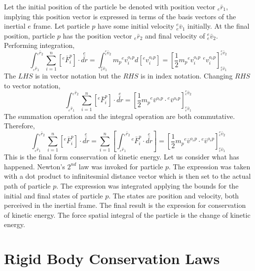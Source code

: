 \documentclass[class=report, 12pt, crop=false]{standalone}
\begin{document}
\begin{center}
Let the initial position of the particle be denoted with position vector ${}_{e}\bar{r}_{1}$, implying this position vector is expressed in terms of the basis vectors of the inertial $e$ frame. Let particle $p$ have some initial velocity ${}^{e}_{e}\bar{v}_{1}$ initially. At the final position, particle $p$ has the position vector ${}_{e}\bar{r}_{2}$ and final velocity of ${}^{e}_{e}\bar{v}_{2}$. Performing integration,
$$\int^{{}_{e}\bar{r}_{2}}_{{}_{e}\bar{r}_{1}} \sum^{n}_{i = 1}\left[{}^{e}\bar{F}^{p}_{i}\right] \cdot\overset{e}{\bar{dr}} = \int^{{}^{e}_{e}\bar{v}_{2}}_{{}^{e}_{e}\bar{v}_{1}} m_{p} {}^{e}v^{o_{e}p}_{i}d\left[{}^{e}v^{o_{e}p}_{i}\right] =  \left[\frac{1}{2}m_{p} {}^{e}v^{o_{e}p}_{i}\,\,{}^{e}v^{o_{e}p}_{i}\right]^{{}^{e}_{e}\bar{v}_{2}}_{{}^{e}_{e}\bar{v}_{1}}$$
The $LHS$ is in vector notation but the $RHS$ is in index notation. Changing $RHS$ to vector notation,
$$\int^{{}_{e}\bar{r}_{2}}_{{}_{e}\bar{r}_{1}} \sum^{n}_{i = 1}\left[{}^{e}\bar{F}^{p}_{i}\right] \cdot\overset{e}{\bar{dr}} = \left[\frac{1}{2}m_{p}{}^{e}\bar{v}^{o_{e}p}\cdot{}^{e}\bar{v}^{o_{e}p}\right]^{{}^{e}_{e}\bar{v}_{2}}_{{}^{e}_{e}\bar{v}_{1}}$$
The summation operation and the integral operation are both commutative. Therefore,
$$\int^{{}_{e}\bar{r}_{2}}_{{}_{e}\bar{r}_{1}} \sum^{n}_{i = 1}\left[{}^{e}\bar{F}^{p}_{i}\right] \cdot\overset{e}{\bar{dr}} =  \sum^{n}_{i = 1}\left[\int^{{}_{e}\bar{r}_{2}}_{{}_{e}\bar{r}_{1}}{}^{e}\bar{F}^{p}_{i}\cdot\overset{e}{\bar{dr}}\right]  = \left[\frac{1}{2}m_{p}{}^{e}\bar{v}^{o_{e}p}\cdot{}^{e}\bar{v}^{o_{e}p}\right]^{{}^{e}_{e}\bar{v}_{2}}_{{}^{e}_{e}\bar{v}_{1}}$$
This is the final form conservation of kinetic energy. Let us consider what has happened. Newton's $2^{nd}$ law was invoked for particle $p$. The expression was taken with a dot product to infinitesmial distance vector which is then set to the actual path of particle $p$. The expression was integrated applying the bounds for the initial and final states of particle $p$. The states are position and velocity, both perceived in the inertial frame. The final result is the expresion for conservation of kinetic energy. The force spatial integral of the particle is the change of kinetic energy.
\chapter{Rigid Body Conservation Laws}
\begin{comment}
\end{comment}

\end{center}
\end{document}
